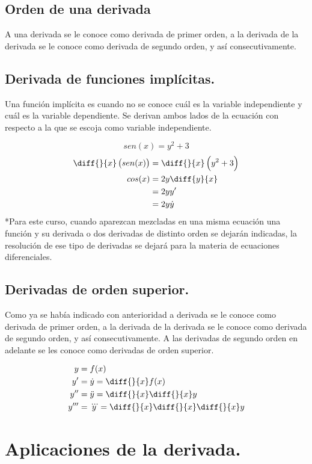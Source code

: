 \documentclass[oneside,spanish,letterpaper]{extbook}
\theoremstyle{mythmstyle}
\begin{document}
\section{Orden de una derivada}
A una derivada se le conoce como derivada de primer orden, a la derivada de la derivada se le conoce como derivada de 
segundo orden, y así consecutivamente.
\section{Derivada de funciones implícitas.}
Una función implícita es cuando no se conoce cuál es la variable independiente y cuál es la variable dependiente.
Se derivan ambos lados de la ecuación con respecto a la que se escoja como variable independiente.

 $$sen(x)=y^2 +3$$
\begin{align*}
\diff{}{x}\left(sen(x)\right) & = \diff{}{x}\left(y^2 +3\right)\\
cos(x)  &=2y\diff{y}{x}\\
 &=2yy'\\
 &=2y\dot y 
\end{align*}
*Para este curso, cuando aparezcan mezcladas en una misma ecuación una función y su derivada o dos derivadas de distinto orden
se dejarán indicadas, la resolución de ese tipo de derivadas se dejará para la materia de ecuaciones diferenciales.

\section{Derivadas de orden superior.}
Como ya se había indicado con anterioridad a derivada se le conoce como derivada de primer orden, a la derivada
de la derivada se le conoce como derivada de 
segundo orden, y así consecutivamente. A las derivadas de segundo orden en adelante se les conoce como derivadas de orden 
superior.


\begin{align*}
y&=f(x)\\
y'&=\dot y=\diff{}{x}f(x)\\
y''&=\ddot y=\diff{}{x}\diff{}{x}y\\
y'''&=\dddot y=\diff{}{x}\diff{}{x}\diff{}{x}y
\end{align*}



\chapter{Aplicaciones de la derivada.}
\end{document}
